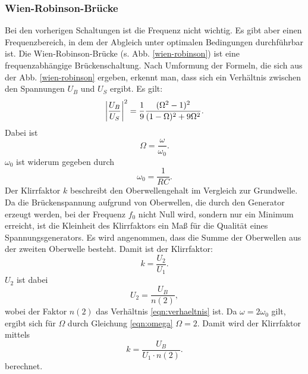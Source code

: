 \subsubsection{Wien-Robinson-Brücke}
Bei den vorherigen Schaltungen ist die Frequenz nicht wichtig. 
Es gibt aber einen Frequenzbereich, in dem der Abgleich unter optimalen Bedingungen durchführbar ist.
\newline
Die Wien-Robinson-Brücke (s. Abb. \ref{wien-robinson}) ist eine frequenzabhängige Brückenschaltung.
Nach Umformung der Formeln, die sich aus der Abb. \ref{wien-robinson} ergeben, erkennt man, dass
sich ein Verhältnis zwischen den Spannungen $U_B$ und $U_S$ ergibt. 
Es gilt:
\begin{equation}
    \abs{\frac{U_B}{U_S}}^2 = \frac{1}{9} \frac{(\Omega^2 -1)^2}{(1- \Omega)^2 + 9 \Omega^2}.
    \label{eqn:verhaeltnis}
\end{equation}
Dabei ist
\begin{equation}
    \Omega = \frac{\omega}{\omega_0}.
    \label{omega}
\end{equation}
$\omega_0$ ist widerum gegeben durch
\begin{equation}
    \omega_0 = \frac{1}{RC}.
\end{equation}
\newline
Der Klirrfaktor $k$ beschreibt den Oberwellengehalt im Vergleich zur
Grundwelle. Da die Brückenspannung aufgrund von Oberwellen, die durch
den Generator erzeugt werden, bei der Frequenz $f_0$ nicht Null wird,
sondern nur ein Minimum erreicht, ist die Kleinheit des Klirrfaktors
ein Maß für die Qualität eines Spannungsgenerators.
\newline
Es wird angenommen, dass die Summe der Oberwellen aus der zweiten
Oberwelle besteht. Damit ist der Klirrfaktor:
\begin{equation*}
    k = \frac{U_2}{U_1}.
\end{equation*}
$U_2$ ist dabei
\begin{equation*}
    U_2 = \frac{U_B}{n(2)},
\end{equation*}
wobei der Faktor $n(2)$ das Verhältnis \eqref{eqn:verhaeltnis} ist.
Da $\omega = 2 \omega_0$ gilt, ergibt sich für $\Omega$ durch Gleichung \eqref{eqn:omega}
$\Omega = 2$.
Damit wird der Klirrfaktor mittels
\begin{equation}
    k = \frac{U_B}{U_1 \cdot n(2)}. %
\end{equation}
berechnet.


